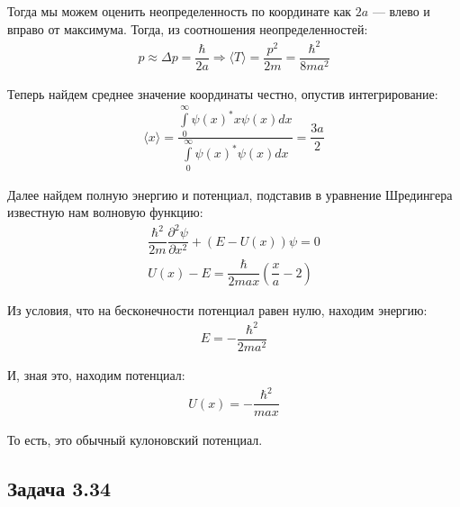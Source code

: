 \documentclass[12pt]{article}
\begin{document}
Тогда мы можем оценить неопределенность по координате как $2a$ --- влево и вправо от максимума. Тогда, из соотношения неопределенностей:
\begin{gather*}
    p \approx \Delta p = \dfrac{\hbar}{2a} \Rightarrow \langle T \rangle = \dfrac{p^2}{2m} = \dfrac{\hbar^2}{8ma^2}
\end{gather*}

Теперь найдем среднее значение координаты честно, опустив интегрирование:
\begin{gather*}
    \langle x \rangle = \dfrac{\int\limits_0^{\infty}\psi(x)^*x\psi(x)dx}{\int\limits_0^{\infty}\psi(x)^*\psi(x)dx} = \dfrac{3a}{2}
\end{gather*}

Далее найдем полную энергию и потенциал, подставив в уравнение Шредингера известную нам волновую функцию:
\begin{gather*}
    \dfrac{\hbar^2}{2m}\dfrac{\partial^2\psi}{\partial x^2} +  (E-U(x))\psi=0\\
    U(x) - E = \dfrac{\hbar}{2max}\left( \dfrac{x}{a} - 2 \right)
\end{gather*}

Из условия, что на бесконечности потенциал равен нулю, находим энергию:
\begin{gather*}
    E = -\dfrac{\hbar^2}{2ma^2}
\end{gather*}

И, зная это, находим потенциал:
\begin{gather*}
    U(x) = - \dfrac{\hbar^2}{max}
\end{gather*}

То есть, это обычный кулоновский потенциал.

\subsection{Задача 3.34}
\label{task_3.34}
\end{document}
